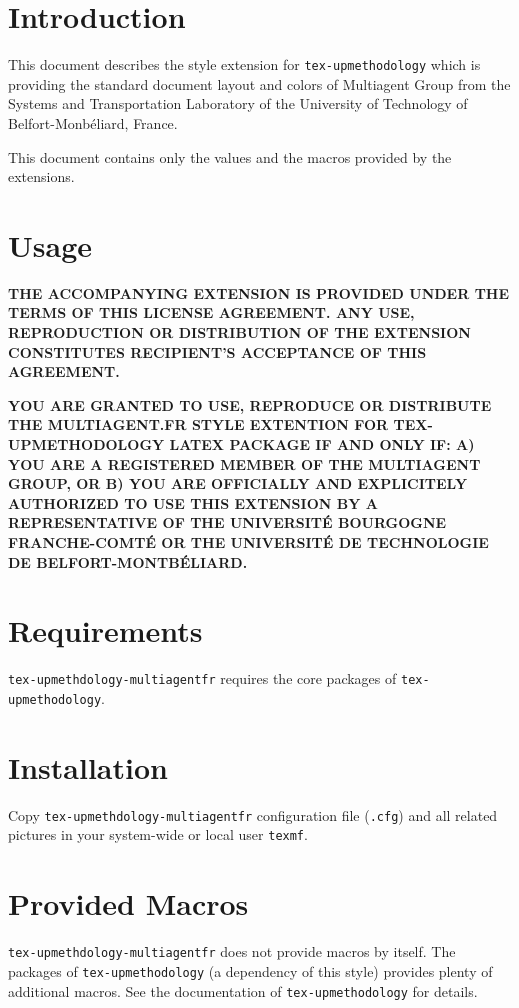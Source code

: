 \documentclass[article]{upmethodology-document}
\begin{document}
\section{Introduction}

This document describes the style extension for \texttt{tex-upmethodology} which is providing the standard document layout and colors of Multiagent Group from the Systems and Transportation Laboratory of the University of Technology of Belfort-Monb\'eliard, France.

This document contains only the values and the macros provided by the extensions.

\section{Usage}

\textbf{THE ACCOMPANYING EXTENSION IS PROVIDED UNDER THE TERMS OF THIS LICENSE AGREEMENT. ANY USE, REPRODUCTION OR DISTRIBUTION OF THE EXTENSION CONSTITUTES RECIPIENT'S ACCEPTANCE OF THIS AGREEMENT.}

\textbf{YOU ARE GRANTED TO USE, REPRODUCE OR DISTRIBUTE THE MULTIAGENT.FR STYLE EXTENTION FOR TEX-UPMETHODOLOGY LATEX PACKAGE IF AND ONLY IF: A) YOU ARE A REGISTERED MEMBER OF THE MULTIAGENT GROUP, OR B) YOU ARE OFFICIALLY AND EXPLICITELY AUTHORIZED TO USE THIS EXTENSION BY A REPRESENTATIVE OF THE UNIVERSIT\'E BOURGOGNE FRANCHE-COMT\'E OR THE UNIVERSIT\'E DE TECHNOLOGIE DE BELFORT-MONTB\'ELIARD.}

\section{Requirements}

\texttt{tex-upmethdology-multiagentfr} requires the core packages of \texttt{tex-upmethodology}.

\section{Installation}

Copy \texttt{tex-upmethdology-multiagentfr} configuration file (\texttt{.cfg}) and all related pictures in your system-wide or local user \texttt{texmf}.

\section{Provided Macros}

\texttt{tex-upmethdology-multiagentfr} does not provide macros by itself. The packages of \texttt{tex-upmethodology} (a dependency of this style) provides plenty of additional macros. See the documentation of \texttt{tex-upmethodology} for details.
\end{document}
